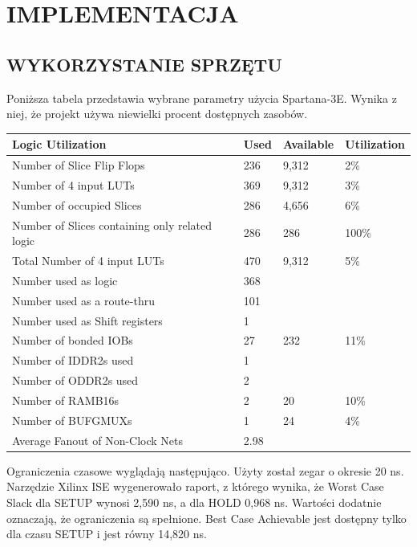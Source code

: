 \documentclass[11pt]{article}
\begin{document}
\section{IMPLEMENTACJA}

\subsection{WYKORZYSTANIE SPRZĘTU}

Poniższa tabela przedstawia wybrane parametry użycia Spartana-3E.
Wynika z niej, że projekt używa niewielki procent dostępnych zasobów.


\begin{tabular}{|l|l|l|l|}
\hline
Logic Utilization &
Used &
Available &
Utilization \\
\hline
Number of Slice Flip Flops &
236 &
9,312 &
2\% \\
\hline
Number of 4 input LUTs &
369 &
9,312 &
3\% \\
\hline
Number of occupied Slices &
286 &
4,656 & 
6\% \\
\hline
Number of Slices containing only related logic &
286 &
286 &
100\% \\
\hline

Total Number of 4 input LUTs &
470 &
9,312 &
5\% \\
\hline
Number used as logic &
368 & & \\
\hline
 
Number used as a route-thru &
101 & & \\
\hline
 
Number used as Shift registers &
1 & & \\
\hline
 
Number of bonded IOBs &
27 &
232 &
11\% \\
\hline
Number of IDDR2s used &
1 & & \\
\hline 
 
Number of ODDR2s used &
2 & & \\
\hline
 
 
Number of RAMB16s &
2 &
20 &
10\% \\
\hline
Number of BUFGMUXs &
1 &
24 &
4\% \\
\hline
Average Fanout of Non-Clock Nets &
2.98 & & \\
\hline
\end{tabular}

\vspace{1em}

Ograniczenia czasowe wyglądają następująco.
Użyty został zegar o okresie 20 ns.
Narzędzie Xilinx ISE wygenerowało raport, z którego wynika, że Worst Case Slack dla SETUP wynosi 2,590 ns, a dla HOLD 0,968 ns.
Wartości dodatnie oznaczają, że ograniczenia są spełnione.
Best Case Achievable jest dostępny tylko dla czasu SETUP i jest równy 14,820 ns.
\end{document}
